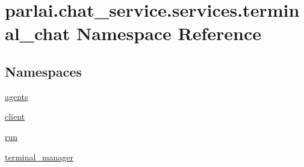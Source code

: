 \hypertarget{namespaceparlai_1_1chat__service_1_1services_1_1terminal__chat}{}\section{parlai.\+chat\+\_\+service.\+services.\+terminal\+\_\+chat Namespace Reference}
\label{namespaceparlai_1_1chat__service_1_1services_1_1terminal__chat}
\subsection*{Namespaces}
\begin{DoxyCompactItemize}
\item 
 \hyperlink{namespaceparlai_1_1chat__service_1_1services_1_1terminal__chat_1_1agents}{agents}
\item 
 \hyperlink{namespaceparlai_1_1chat__service_1_1services_1_1terminal__chat_1_1client}{client}
\item 
 \hyperlink{namespaceparlai_1_1chat__service_1_1services_1_1terminal__chat_1_1run}{run}
\item 
 \hyperlink{namespaceparlai_1_1chat__service_1_1services_1_1terminal__chat_1_1terminal__manager}{terminal\+\_\+manager}
\end{DoxyCompactItemize}
